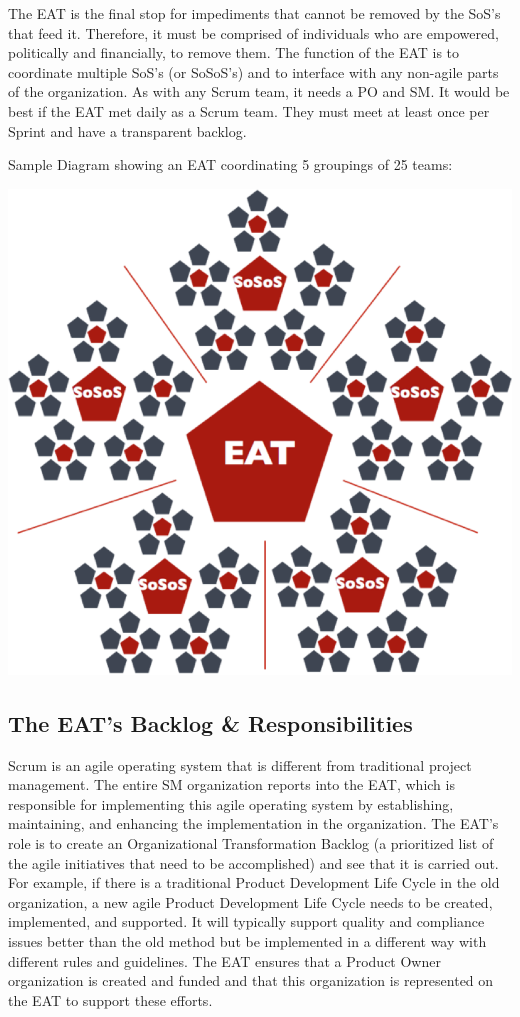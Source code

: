 \documentclass[12pt,a4paper,parskip=full]{scrartcl}
\begin{document}
The EAT is the final stop for
impediments that cannot be removed by the SoS's that feed it. Therefore, it
must be comprised of individuals who are empowered, politically and
financially, to remove them. 
The function of the EAT is to coordinate
multiple SoS's (or SoSoS's) and to interface with any non-agile parts 
of the organization. As with any Scrum team, it needs a PO and SM.
It would be best if the EAT met daily as a Scrum team. They must meet at
least once per Sprint and have a transparent backlog.

Sample Diagram showing an EAT coordinating 5 groupings of 25 teams:

\includegraphics[width=\textwidth,height=\textheight,keepaspectratio]{SoS-EAT.png}

\subsection{The EAT's Backlog \& Responsibilities}
Scrum is an agile operating system that is different from traditional
project management. The entire SM organization reports into the EAT, which
is responsible for implementing this agile operating system by
establishing, maintaining, and enhancing the implementation in the
organization.
The EAT's role is to create an Organizational Transformation Backlog (a
prioritized list of the agile initiatives that need to be accomplished) and
see that it is carried out. For example, if there is a traditional Product
Development Life Cycle in the old organization, a new agile Product
Development Life Cycle needs to be created, implemented, and supported. It
will typically support quality and compliance issues better than the old
method but be implemented in a different way with different rules and
guidelines. The EAT ensures that a Product Owner organization is created and funded
and that this organization is represented on the EAT to support these efforts.
\end{document}

